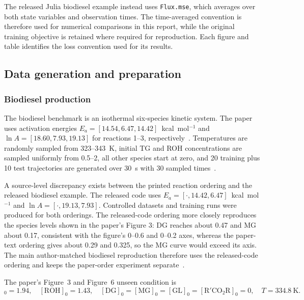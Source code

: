 \documentclass[11pt,a4paper]{article}
\begin{document}
The released Julia biodiesel example instead
uses \texttt{Flux.mse}, which averages over
both state variables and observation times.
The time-averaged convention is therefore
used for numerical comparisons in this report,
while the original training objective is
retained where required for reproduction.
Each figure and table identifies the
loss convention used for its results.

\subsection{Data generation and preparation}

\subsubsection{Biodiesel production}

The biodiesel benchmark is an isothermal six-species kinetic system. The paper uses activation energies $E_a=[14.54,6.47,14.42]$~kcal~mol$^{-1}$ and $\ln A=[18.60,7.93,19.13]$ for reactions 1--3, respectively~\cite{Koenig_2025}. Temperatures are randomly sampled from 323--343~K, initial TG and ROH concentrations are sampled uniformly from 0.5--2, all other species start at zero, and 20 training plus 10 test trajectories are generated over 30~s with 30 sampled times~\cite{Koenig_2025}.

A source-level discrepancy exists between the printed reaction ordering and the released biodiesel example. The released code uses $E_a = [\cdot, \mathbf{14.42}, \mathbf{6.47}]$~kcal~mol$^{-1}$ and $\ln A=[\cdot,\mathbf{19.13},\mathbf{7.93}]$. Controlled datasets and training runs were produced for both orderings. The released-code ordering more closely reproduces the species levels shown in the paper's Figure 3: DG reaches about 0.47 and MG about 0.17, consistent with the figure's 0–0.6 and 0–0.2 axes, whereas the paper-text ordering gives about 0.29 and 0.325, so the MG curve would exceed its axis. The main author-matched biodiesel reproduction therefore uses the released-code ordering and keeps the paper-order experiment separate~\cite{ChemKANRepo2026}.

The paper's Figure~3 and Figure~6 unseen condition is
\begin{equation}
[\mathrm{TG}]_0=1.94,\quad[\mathrm{ROH}]_0=1.43,\quad
[\mathrm{DG}]_0=[\mathrm{MG}]_0=[\mathrm{GL}]_0=[\mathrm{R'CO_2R}]_0=0,\quad T=334.8~\mathrm{K}.
\end{equation}
\end{document}
